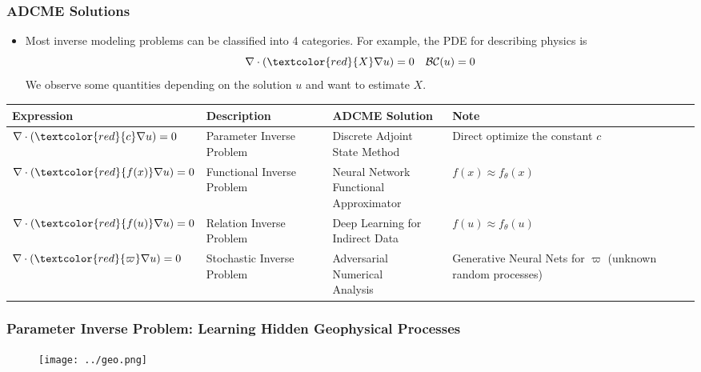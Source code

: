 \documentclass{beamer}
\begin{document}
\begin{frame}
	\frametitle{ADCME Solutions}
\begin{itemize}
	\item Most inverse modeling problems can be classified into 4 categories. For example, the PDE for describing physics is
	\begin{equation}
		\nabla \cdot (\textcolor{red}{X} \nabla u) = 0\quad \mathcal{B}\mathcal{C}(u) = 0
	\end{equation}
	We observe some quantities depending on the solution $u$ and want to estimate $X$.
\end{itemize}
{
\tiny
\begin{table}[]
\begin{tabular}{@{}llll@{}}
\toprule
Expression                                       & Description                & ADCME Solution                         & Note                                     \\ \midrule
$\nabla \cdot (\textcolor{red}{c} \nabla u) = 0$ & Parameter Inverse Problem  & \makecell{Discrete Adjoint\\ State Method}          & Direct optimize the constant $c$                      \\ \hline
$\nabla \cdot (\textcolor{red}{f(x)} \nabla u) = 0$ & Functional Inverse Problem & \makecell{Neural Network \\ Functional Approximator} & $f(x) \approx f_{\theta}(x)$             \\ \hline
$\nabla \cdot (\textcolor{red}{f(u)} \nabla u) = 0$ & Relation Inverse Problem   & \makecell{Deep Learning for\\ Indirect Data}        & $f(u) \approx f_{\theta}(u)$             \\ \hline
$\nabla \cdot (\textcolor{red}{\varpi} \nabla u) = 0$ & Stochastic Inverse Problem & \makecell{Adversarial Numerical\\ Analysis}         & \makecell{Generative Neural Nets for $\varpi$\\ (unknown random processes)} \\ \bottomrule
\end{tabular}
\end{table}
}
\end{frame}


\begin{frame}
	\frametitle{Parameter Inverse Problem: Learning Hidden Geophysical Processes}
	\begin{figure}[hbt]
  \texttt{[image: ../geo.png]}
\end{figure}
\end{frame}
\end{document}
